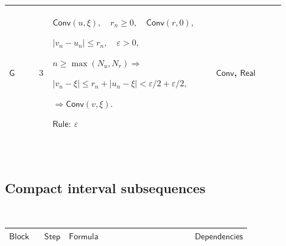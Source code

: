 \documentclass[12pt,reqno]{amsart}
\theoremstyle{blueplain}
\numberwithin{equation}{section}
\newlength{\FTCOneColumnBody}
\begin{document}
{\scriptsize \setlength{\parskip}{0pt}\nointerlineskip
\noindent 
\begin{tabular}{|@{}>{\centering\arraybackslash}m{0.10658\linewidth}|>{\centering\arraybackslash}m{0.03553\linewidth}|>{\centering\arraybackslash}m{0.52105\linewidth}|>{\centering\arraybackslash}m{0.23684\linewidth}|}
\hline
\hypertarget{proof:G3}{$\displaystyle \mathsf{G}$} & $\displaystyle 3$ & $%
\displaystyle \mathsf{Conv}(u,\xi),\quad r_n\ge0,\quad\mathsf{Conv}(r,0),$%
\par$\displaystyle |v_n-u_n|\le r_n,\quad\varepsilon>0,$\par$\displaystyle %
n\ge\max(N_u,N_r)\Rightarrow$\par$\displaystyle |v_n-\xi|\le
r_n+|u_n-\xi|<\varepsilon/2+\varepsilon/2,$\par$\displaystyle \Rightarrow%
\mathsf{Conv}(v,\xi).$\par$\displaystyle \mathsf{Rule}:\ \varepsilon$ & 
\hyperlink{def:Conv}{$\displaystyle \mathsf{Conv}$}, \hyperlink{ax:Real}{$%
\displaystyle \mathsf{Real}$} \\ \hline
\end{tabular}%
}

{\scriptsize \ }

\subsection{\protect\scriptsize Compact interval subsequences}

{\scriptsize {\ }}

{\scriptsize \setlength{\parskip}{0pt}\nointerlineskip
\noindent 
\begin{tabular}{|@{}>{\centering\arraybackslash}m{\FTCOneColumnBody}|}
\hline
$\displaystyle \mathsf{CompactIntervalSubsequences}$ \\ \hline
\end{tabular}%
}

{\scriptsize \setlength{\parskip}{0pt}\nointerlineskip
\noindent 
\begin{tabular}{|@{}>{\centering\arraybackslash}m{0.10658\linewidth}|>{\centering\arraybackslash}m{0.03553\linewidth}|>{\centering\arraybackslash}m{0.52105\linewidth}|>{\centering\arraybackslash}m{0.23684\linewidth}|}
\hline
$\displaystyle \mathsf{Block}$ & $\displaystyle \mathsf{Step}$ & $%
\displaystyle \mathsf{Formula}$ & $\displaystyle \mathsf{Dependencies}$ \\ 
\hline
\end{tabular}%
}
\end{document}
